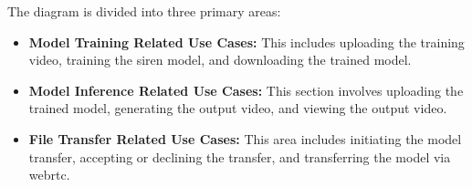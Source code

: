The diagram is divided into three primary areas:

\begin{itemize}
    \item \textbf{Model Training Related Use Cases:} This includes uploading the training video, training the \gls{siren} model, and downloading the trained model.
    \item \textbf{Model Inference Related Use Cases:} This section involves uploading the trained model, generating the output video, and viewing the output video.
    \item \textbf{File Transfer Related Use Cases:} This area includes initiating the model transfer, accepting or declining the transfer, and transferring the model via \gls{webrtc}.
\end{itemize}
\pagebreak 

